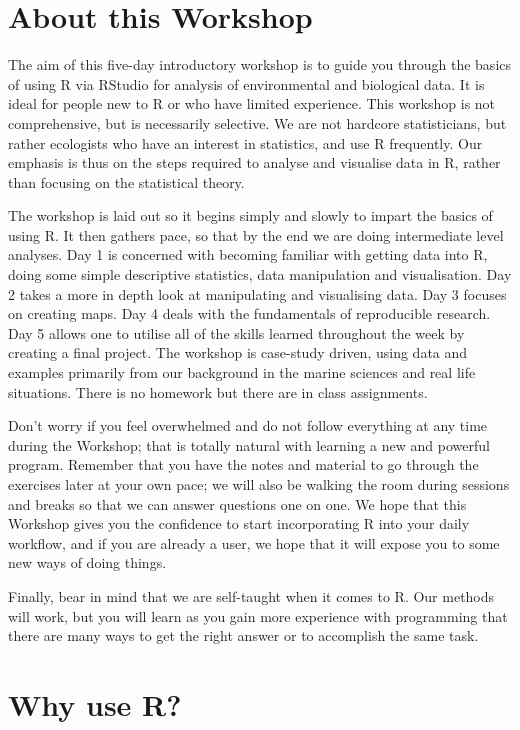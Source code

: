 \documentclass[]{book}
\theoremstyle{definition}
\theoremstyle{definition}
\theoremstyle{definition}
\theoremstyle{remark}
\begin{document}
\section{About this Workshop}\label{about-this-workshop}

The aim of this five-day introductory workshop is to guide you through
the basics of using R via RStudio for analysis of environmental and
biological data. It is ideal for people new to R or who have limited
experience. This workshop is not comprehensive, but is necessarily
selective. We are not hardcore statisticians, but rather ecologists who
have an interest in statistics, and use R frequently. Our emphasis is
thus on the steps required to analyse and visualise data in R, rather
than focusing on the statistical theory.

The workshop is laid out so it begins simply and slowly to impart the
basics of using R. It then gathers pace, so that by the end we are doing
intermediate level analyses. Day 1 is concerned with becoming familiar
with getting data into R, doing some simple descriptive statistics, data
manipulation and visualisation. Day 2 takes a more in depth look at
manipulating and visualising data. Day 3 focuses on creating maps. Day 4
deals with the fundamentals of reproducible research. Day 5 allows one
to utilise all of the skills learned throughout the week by creating a
final project. The workshop is case-study driven, using data and
examples primarily from our background in the marine sciences and real
life situations. There is no homework but there are in class
assignments.

Don't worry if you feel overwhelmed and do not follow everything at any
time during the Workshop; that is totally natural with learning a new
and powerful program. Remember that you have the notes and material to
go through the exercises later at your own pace; we will also be walking
the room during sessions and breaks so that we can answer questions one
on one. We hope that this Workshop gives you the confidence to start
incorporating R into your daily workflow, and if you are already a user,
we hope that it will expose you to some new ways of doing things.

Finally, bear in mind that we are self-taught when it comes to R. Our
methods will work, but you will learn as you gain more experience with
programming that there are many ways to get the right answer or to
accomplish the same task.

\section{Why use R?}\label{why-use-r}
\end{document}
